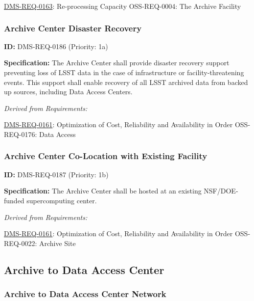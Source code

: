 \documentclass[SE,toc,lsstdraft]{lsstdoc}
\begin{document}
\hyperref[DMS-REQ-0163]{DMS-REQ-0163}:
Re-processing Capacity \newline
OSS-REQ-0004:
The Archive Facility \newline

\subsubsection{Archive Center Disaster Recovery}

\label{DMS-REQ-0186}
\textbf{ID:} DMS-REQ-0186 (Priority: 1a)

\textbf{Specification:} The Archive Center shall provide disaster recovery support preventing loss of LSST data in the case of infrastructure or facility-threatening events.  This support shall enable recovery of all LSST archived data from backed up sources, including Data Access Centers.

\emph{Derived from Requirements:}

\hyperref[DMS-REQ-0161]{DMS-REQ-0161}:
Optimization of Cost, Reliability and Availability in Order \newline
OSS-REQ-0176:
Data Access \newline

\subsubsection{Archive Center Co-Location with Existing Facility}

\label{DMS-REQ-0187}
\textbf{ID:} DMS-REQ-0187 (Priority: 1b)

\textbf{Specification:} The Archive Center shall be hosted at an existing NSF/DOE-funded supercomputing center.

\emph{Derived from Requirements:}

\hyperref[DMS-REQ-0161]{DMS-REQ-0161}:
Optimization of Cost, Reliability and Availability in Order \newline
OSS-REQ-0022:
Archive Site \newline

\subsection{Archive to Data Access Center}

\subsubsection{Archive to Data Access Center Network}
\end{document}
